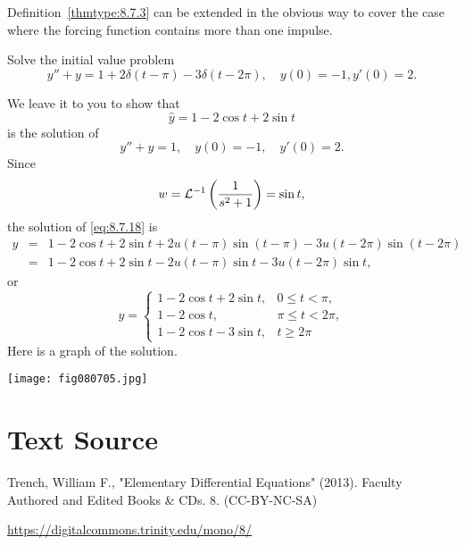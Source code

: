 \documentclass{ximera}
\begin{document}
Definition~\ref{thmtype:8.7.3} can be extended in the obvious way to cover
the case where the forcing function contains more than one impulse.
\begin{example}\label{example:8.7.3}
Solve the  initial value problem
\begin{equation} \label{eq:8.7.18}
y''+y=1+2\delta(t-\pi)-3\delta(t-2\pi), \quad    y(0)=-1,   y'(0)=2.
\end{equation}
\begin{explanation}
We leave it to you to show that
$$
\hat y= 1-2\cos t+2\sin t
$$
is the solution of
$$
y''+y=1, \quad    y(0)=-1,\quad    y'(0)=2.
$$
Since
$$
w={\cal L}^{-1}\left(\frac{1}{s^2+1}\right)=\sin t,
$$
the solution of  \eqref{eq:8.7.18} is
\begin{eqnarray*}
y&=&1-2\cos t+2\sin t+2u(t-\pi)\sin(t-\pi)-3u(t-2\pi)\sin(t-2\pi)\\
&=&1-2\cos t+2\sin t-2u(t-\pi)\sin t-3u(t-2\pi)\sin t,
\end{eqnarray*}
or
\begin{equation} \label{eq:8.7.19}
y=\left\{\begin{array}{cl} 1-2\cos t+2\sin t,&0\leq t<\pi,\\
1-2\cos t,&\pi\leq t<2\pi,\\
1-2\cos t-3\sin t,&t\geq 2\pi\end{array}\right.
\end{equation}
Here is a graph of the solution.
\begin{image}
 \texttt{[image: fig080705.jpg]}
\end{image}
\end{explanation}
\end{example}


\section*{Text Source}
Trench, William F., "Elementary Differential Equations" (2013). Faculty Authored and Edited Books \& CDs. 8. (CC-BY-NC-SA)

\href{https://digitalcommons.trinity.edu/mono/8/}{https://digitalcommons.trinity.edu/mono/8/}
\end{document}
